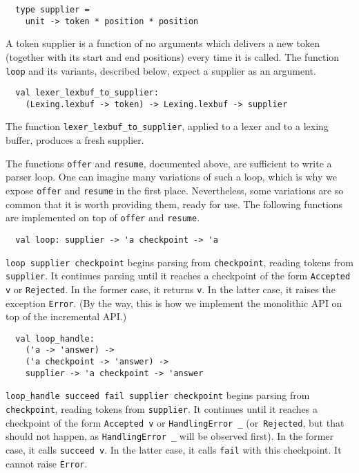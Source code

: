 \documentclass[onecolumn,11pt,nocopyrightspace,preprint]{sigplanconf}
\begin{document}

\begin{verbatim}
  type supplier =
    unit -> token * position * position
\end{verbatim}

A token supplier is a function of no arguments which delivers a new token
(together with its start and end positions) every time it is called. The
function \verb+loop+ and its variants, described below, expect a supplier
as an argument.


\begin{verbatim}
  val lexer_lexbuf_to_supplier:
    (Lexing.lexbuf -> token) -> Lexing.lexbuf -> supplier
\end{verbatim}

The function \verb+lexer_lexbuf_to_supplier+, applied to a lexer and to a
lexing buffer, produces a fresh supplier.


The functions \verb+offer+ and \verb+resume+, documented above, are sufficient
to write a parser loop. One can imagine many variations of such a loop, which
is why we expose \verb+offer+ and \verb+resume+ in the first place.
Nevertheless, some variations are so common that it is worth providing them,
ready for use. The following functions are implemented on top of \verb+offer+
and \verb+resume+.


\begin{verbatim}
  val loop: supplier -> 'a checkpoint -> 'a
\end{verbatim}

\verb+loop supplier checkpoint+ begins parsing from \verb+checkpoint+, reading
tokens from \verb+supplier+. It continues parsing until it reaches a
checkpoint of the form \verb+Accepted v+ or \verb+Rejected+. In the former
case, it returns \verb+v+. In the latter case, it raises the
exception \verb+Error+. (By the way, this is how we implement the monolithic
API on top of the incremental API.)

\begin{verbatim}
  val loop_handle:
    ('a -> 'answer) ->
    ('a checkpoint -> 'answer) ->
    supplier -> 'a checkpoint -> 'answer
\end{verbatim}

\verb+loop_handle succeed fail supplier checkpoint+ begins parsing from
\verb+checkpoint+, reading tokens from \verb+supplier+. It continues until
it reaches a checkpoint of the form \verb+Accepted v+ or \verb+HandlingError _+
(or~\verb+Rejected+, but that should not happen, as \verb+HandlingError _+
will be observed first). In the former case, it calls \verb+succeed v+. In
the latter case, it calls \verb+fail+ with this checkpoint. It cannot
raise \verb+Error+.
\end{document}
